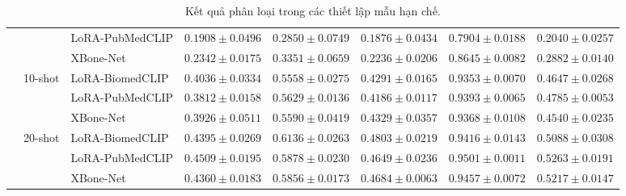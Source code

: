 \begin{table}[H]
{\begin{tabular}{|l|l|l|c|c|c|c|c|}
 &  & LoRA-PubMedCLIP & $0.1908\pm0.0496$ & $0.2850\pm0.0749$ & $0.1876\pm0.0434$ & $0.7904\pm0.0188$ & $0.2040\pm0.0257$ \\ \cline{3-8}
 &  & \cellcolor{gray!12}XBone-Net & \cellcolor{gray!12}$\mathbf{0.2342\pm0.0175}$ & \cellcolor{gray!12}$\mathbf{0.3351\pm0.0659}$ & \cellcolor{gray!12}$\mathbf{0.2236\pm0.0206}$ & \cellcolor{gray!12}$\mathbf{0.8645\pm0.0082}$ & \cellcolor{gray!12}$\mathbf{0.2882\pm0.0140}$ \\ \cline{2-8}
 & \multirow{3}{*}{10-shot} & LoRA-BiomedCLIP & $\mathbf{0.4036\pm0.0334}$ & $0.5558\pm0.0275$ & $0.4291\pm0.0165$ & $0.9353\pm0.0070$ & $0.4647\pm0.0268$ \\ \cline{3-8}
 &  & LoRA-PubMedCLIP & $0.3812\pm0.0158$ & $\mathbf{0.5629\pm0.0136}$ & $0.4186\pm0.0117$ & $\mathbf{0.9393\pm0.0065}$ & $\mathbf{0.4785\pm0.0053}$ \\ \cline{3-8}
 &  & \cellcolor{gray!12}XBone-Net & \cellcolor{gray!12}$0.3926\pm0.0511$ & \cellcolor{gray!12}$0.5590\pm0.0419$ & \cellcolor{gray!12}$\mathbf{0.4329\pm0.0357}$ & \cellcolor{gray!12}$0.9368\pm0.0108$ & \cellcolor{gray!12}$0.4540\pm0.0235$ \\ \cline{2-8}
 & \multirow{3}{*}{20-shot} & LoRA-BiomedCLIP & $0.4395\pm0.0269$ & $\mathbf{0.6136\pm0.0263}$ & $\mathbf{0.4803\pm0.0219}$ & $0.9416\pm0.0143$ & $0.5088\pm0.0308$ \\ \cline{3-8}
 &  & LoRA-PubMedCLIP & $\mathbf{0.4509\pm0.0195}$ & $0.5878\pm0.0230$ & $0.4649\pm0.0236$ & $\mathbf{0.9501\pm0.0011}$ & $\mathbf{0.5263\pm0.0191}$ \\ \cline{3-8}
 &  & \cellcolor{gray!12}XBone-Net & \cellcolor{gray!12}$0.4360\pm0.0183$ & \cellcolor{gray!12}$0.5856\pm0.0173$ & \cellcolor{gray!12}$0.4684\pm0.0063$ & \cellcolor{gray!12}$0.9457\pm0.0072$ & \cellcolor{gray!12}$0.5217\pm0.0147$ \\ \hline
\end{tabular}
}
\caption{Kết quả phân loại trong các thiết lập mẫu hạn chế.}
\label{tab:ch4draft_fewshot}
\end{table}
